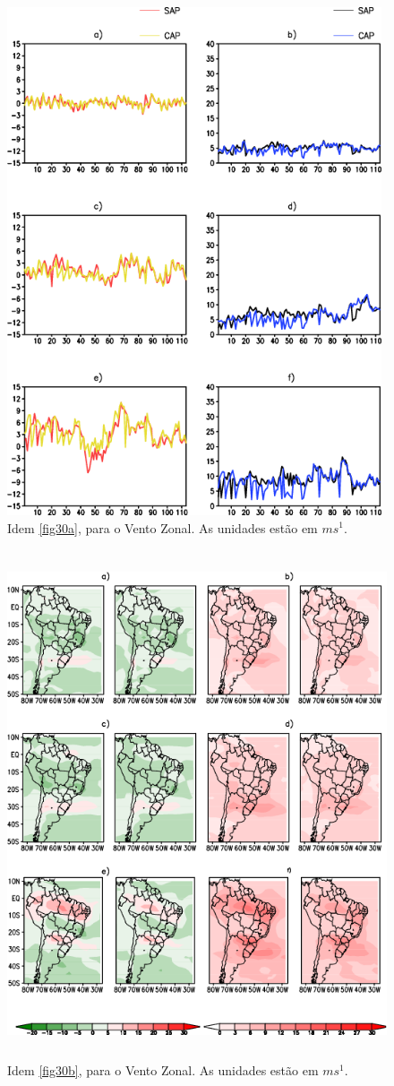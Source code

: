 \begin{figure}[!hbp]
\centering
\includegraphics[height=15cm]{./figs/vies_eqm-uvel.png}
\caption{Idem \autoref{fig30a}, para o Vento Zonal. As unidades estão em $ms^{1}$.}
\label{fig32a}
\end{figure}

\begin{figure}[!hbp]
\centering
\includegraphics[height=15cm]{./figs/campo_vies_eqm-uvel.png}
\caption{Idem \autoref{fig30b}, para o Vento Zonal. As unidades estão em $ms^{1}$.}
\label{fig32b}
\end{figure}

